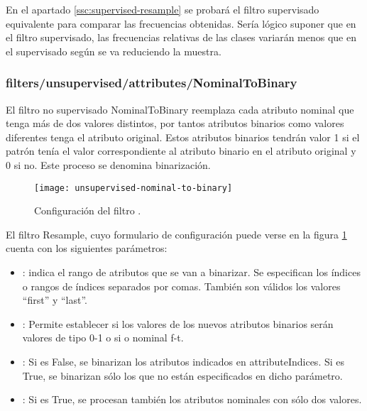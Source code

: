 En el apartado \ref{ssc:supervised-resample} se probará el filtro supervisado equivalente para comparar las frecuencias obtenidas. Sería lógico suponer que en el filtro supervisado, las frecuencias relativas de las clases variarán menos que en el supervisado según se va reduciendo la muestra.

\subsubsection{filters/unsupervised/attributes/NominalToBinary}
El filtro no supervisado NominalToBinary reemplaza cada atributo nominal que tenga más de dos valores distintos, por tantos atributos binarios como valores diferentes tenga el atributo original. Estos atributos binarios tendrán valor 1 si el patrón tenía el valor correspondiente al atributo binario en el atributo original y 0 si no. Este proceso se denomina binarización.

\begin{figure}[ht]
    \centering
    \texttt{[image: unsupervised-nominal-to-binary]}
    \caption{Configuración del filtro .}
    \label{fig:unsupervised-nominal-to-binary}
\end{figure}

El filtro Resample, cuyo formulario de configuración puede verse en la figura \ref{fig:unsupervised-nominal-to-binary} cuenta con los siguientes parámetros:

\begin{itemize}
    \item {}: indica el rango de atributos que se van a binarizar. Se especifican los índices o rangos de índices separados por comas. También son válidos los valores ``first'' y ``last''.
    \item {}: Permite establecer si los valores de los nuevos atributos binarios serán valores de tipo 0-1 o si o nominal f-t.
    \item {}: Si es False, se binarizan los atributos indicados en attributeIndices. Si es True, se binarizan sólo los que no están especificados en dicho parámetro.
    \item {}: Si es True, se procesan también los atributos nominales con sólo dos valores.
\end{itemize}

